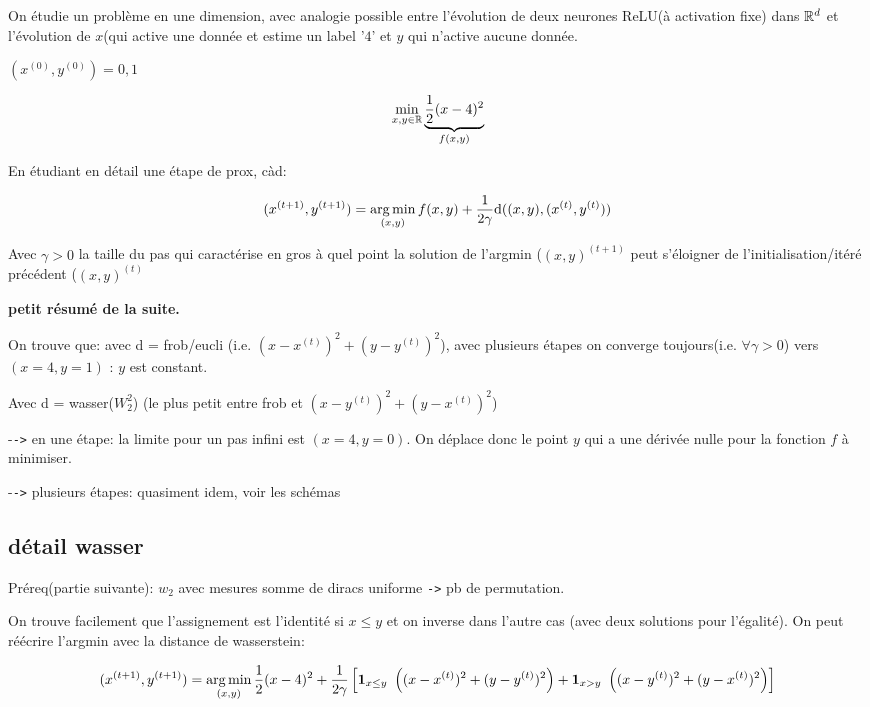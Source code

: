 On étudie un problème en une dimension, avec analogie possible entre l'évolution de deux neurones ReLU(à activation fixe) dans $\mathbb{R}^d$ et l'évolution de $x$(qui active une donnée et estime un label '$4$' et $y$ qui n'active aucune donnée.

$(x^{(0)}, y^{(0)}) = 0, 1$

\begin{equation}
	\min_{x,y \in \mathbb{R}} \underbrace{\frac{1}{2}(x - 4)^2}_{f(x, y)}
\end{equation}

En étudiant en détail une étape de prox, càd:

\begin{equation}
	(x^{(t+1)}, y^{(t+1)}) = \operatorname*{arg\,min}_{(x, y)} f(x, y) + \frac{1}{2 \gamma} \mathrm{d}((x,y),(x^{(t)}, y^{(t)}))
\end{equation}

Avec $\gamma > 0$ la taille du pas qui caractérise en gros à quel point la solution de l'argmin ($(x,y)^{(t+1)}$ peut s'éloigner de l'initialisation/itéré précédent ($(x,y)^{(t)}$

\textbf{petit résumé de la suite.}

On trouve que: avec d = frob/eucli (i.e. $(x-x^{(t)})^2 + (y-y^{(t)})^2$), avec plusieurs étapes on converge toujours(i.e. $\forall \gamma > 0$) vers $(x=4, y=1)$ : $y$ est constant.

Avec d = wasser($W^2_2$) (le plus petit entre frob et $(x-y^{(t)})^2 + (y-x^{(t)})^2$)

-\verb|->| en une étape: la limite pour un pas infini est $(x=4, y=0)$. On déplace donc le point $y$ qui a une dérivée nulle pour la fonction $f$ à minimiser.

-\verb|->| plusieurs étapes: quasiment idem, voir les schémas

\subsection{détail wasser}

Préreq(partie suivante): $w_2$ avec mesures somme de diracs uniforme \verb|->| pb de permutation.

On trouve facilement que l'assignement est l'identité si $x \leq  y$ et on inverse dans l'autre cas (avec deux solutions pour l'égalité). On peut réécrire l'argmin avec la distance de wasserstein:

\begin{equation} \label{eq:argwass}
	(x^{(t+1)}, y^{(t+1)}) = \operatorname*{arg\,min}_{(x, y)} \frac{1}{2}(x-4)^2 + \frac{1}{2 \gamma} \left[ \mathbf{1}_{x \leq y} ~ \left((x-x^{(t)})^2 + (y - y^{(t)})^2\right) + \mathbf{1}_{x > y} ~ \left((x-y^{(t)})^2 + (y - x^{(t)})^2\right) \right]
\end{equation}

